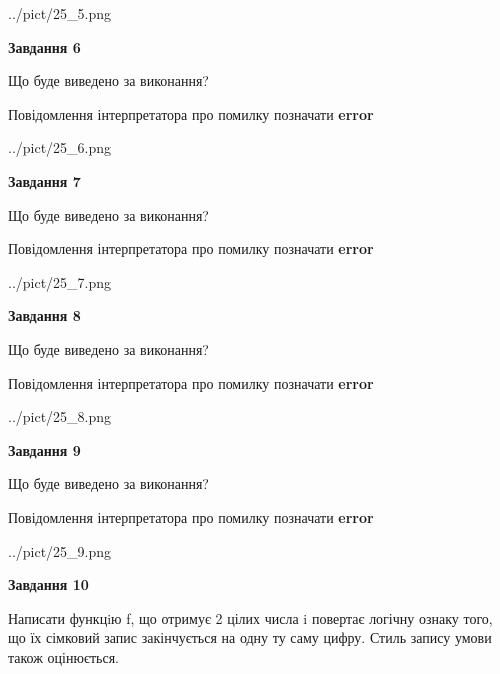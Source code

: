 \documentclass[12pt, ukrainian]{article}
\begin{document}
{\begin {large}
\begin{center}
	{../pict/25_5.png}
\end{center}
\newpage

{\begin {center}\textbf{Завдання 6}\end {center}}\par
Що буде виведено за виконання? \par
Повідомлення інтерпретатора про помилку позначати \textbf{error}

\begin{center}
	{../pict/25_6.png}
\end{center}
\newpage

{\begin {center}\textbf{Завдання 7}\end {center}}\par
Що буде виведено за виконання? \par
Повідомлення інтерпретатора про помилку позначати \textbf{error}

\begin{center}
	{../pict/25_7.png}
\end{center}
\newpage

{\begin {center}\textbf{Завдання 8}\end {center}}\par
Що буде виведено за виконання? \par
Повідомлення інтерпретатора про помилку позначати \textbf{error}

\begin{center}
	{../pict/25_8.png}
\end{center}
\newpage

{\begin {center}\textbf{Завдання 9}\end {center}}\par
Що буде виведено за виконання? \par
Повідомлення інтерпретатора про помилку позначати \textbf{error}

\begin{center}
	{../pict/25_9.png}
\end{center}
\newpage

{\begin {center}\textbf{Завдання 10}\end {center}}\par

Написати функцiю f, що отримує 2 цілих числа i повертає логічну ознаку того, що їх сімковий запис закінчується на одну ту саму цифру. Стиль запису умови також оцінюється.\par
\newpage

\end {large}}
\end{document}
